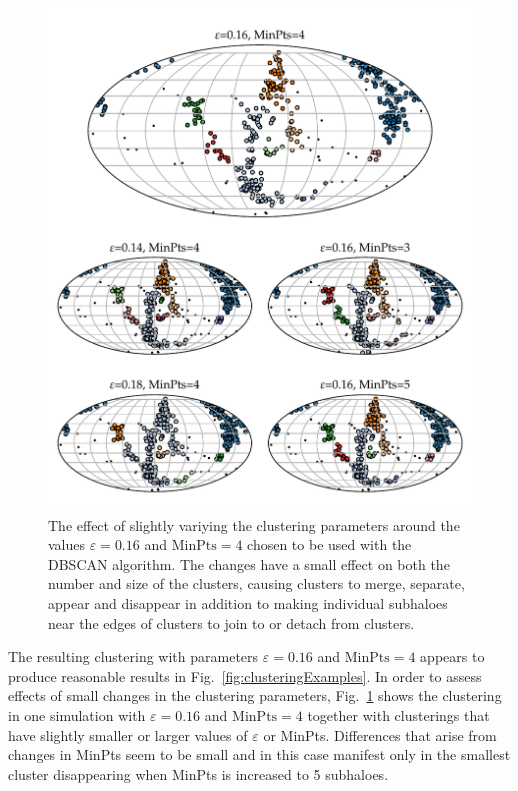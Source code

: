 \documentclass[english, oneside]{HYgradu}
\begin{document}
\begin{figure}
    \centering
    \includegraphics{kuvat/smallClusteringVariations.pdf}
    \caption{The effect of slightly variying the clustering parameters around the values $\varepsilon=0.16$ and $\mathrm{MinPts}=4$ chosen to be used with the DBSCAN algorithm. The changes have a small effect on both the number and size of the clusters, causing clusters to merge, separate, appear and disappear in addition to making individual subhaloes near the edges of clusters to join to or detach from clusters.}\label{fig:clusteringvariations}
\end{figure}

The resulting clustering with parameters $\varepsilon=0.16$ and $\mathrm{MinPts}=4$ appears to produce reasonable results in Fig.~\ref{fig:clusteringExamples}. In order to assess effects of small changes in the clustering parameters, Fig.~\ref{fig:clusteringvariations} shows the clustering in one simulation with $\varepsilon=0.16$ and $\mathrm{MinPts}=4$ together with clusterings that have slightly smaller or larger values of $\varepsilon$ or MinPts. Differences that arise from changes in MinPts seem to be small and in this case manifest only in the smallest cluster disappearing when MinPts is increased to 5 subhaloes.
\end{document}
